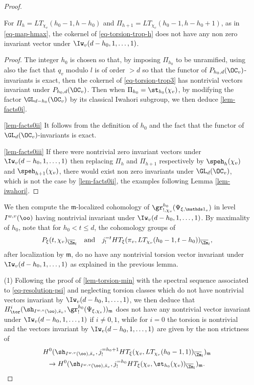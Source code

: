 \begin{proof}
\begin{lemma}
\begin{enumeratei}
\item\label{lem-facts0iii} For $\Pi_h=LT_{\chi_v}(h_0-1,h-h_0)$ and
$\Pi_{h+1}=LT_{\chi_v}(h_0-1,h-h_0+1)$, as in \eqref{eq-map-hmax},
the cokernel of \eqref{eq-torsion-trop-h} does not have any non zero invariant vector under
$\Iw_v(d-h_0,1,\dots,1)$.
\end{enumeratei}
\end{lemma}

\begin{proof}
The integer $h_0$ is chosen so that, by imposing $\Pi_{h_0}$ to be unramified,
using also the fact that $q_v$ modulo $l$ is of order $>d$ so that the functor of $P_{h_0,d}(\OC_v)$-invariants is exact,
then the cokernel of \eqref{eq-torsion-trop3}
has nontrivial vectors invariant under $P_{h_0,d}(\OC_v)$.
Then when $\Pi_{h_0}=\st_{h_0}(\chi_v)$, by modifying the factor
$\GL_{d-h_0}(\OC_v)$ by its classical Iwahori subgroup, we then deduce \eqref{lem-facts0i}.

\eqref{lem-facts0ii} It follows from the definition of $h_0$ and the fact that
the functor of $\GL_d(\OC_v)$-invariants is exact.

\eqref{lem-facts0iii} If there were nontrivial zero invariant vectors under $\Iw_v(d-h_0,1,\dots,1)$
then replacing $\Pi_h$ and $\Pi_{h+1}$ respectively by $\speh_h(\chi_v)$ and
$\speh_{h+1}(\chi_v)$, there would exist non zero invariants under
$\GL_d(\OC_v)$, which is not the case by \eqref{lem-facts0ii}, \cf the examples following
Lemma \ref{lem-iwahori}.
\end{proof}

We then compute the $\mathfrak m$-localized cohomology of
$\gr^{h_0}_{!,\chi_v}(\Psi_{\xi,\mathds 1_v})$
in level $I^{w,v}(\oo)$ having nontrivial invariant under
$\Iw_v(d-h_0,1,\dots,1)$.
By maximality of $h_0$, note that for $h_0<t \leq d$, the cohomology groups of
\[
P_\xi(t,\chi_v)_{\overline \Zm_l}\quad\text{and}\quad j^{=t}_! HT_\xi(\pi_v,LT_{\chi_v}(h_0-1,t-h_0))_{\overline \Zm_l},
\]
after localization by $\mathfrak m$, do no
have any nontrivial torsion vector invariant under \hbox{$\Iw_v(d-h_0,1,\dots,1)$}
as explained in the previous lemma.

(1) Following the proof of \ref{lem-torsion-min} with the spectral sequence
associated to
\eqref{eq-resolution-psi} and neglecting torsion classes
which do not have nontrivial vectors invariant by \hbox{$\Iw_v(d-h_0,1,\dots,1)$},
we then deduce that
$H^i_{\tor}(\sh_{I^{w,v}(\oo),\bar s_v},
\gr^{h_0}_{!}(\Psi_{\xi,\chi_v}))_{\mathfrak m}$ does not have any nontrivial vector invariant under $\Iw_v(d-h_0,1,\dots,1)$ if $i \neq 0,1$,
while for $i=0$ the torsion is nontrivial and the
vectors invariant by $\Iw_v(d-h_0,1,\dots,1)$ are given by the non strictness of
\begin{multline} \label{eq-torsion-trop}
H^{0}(\sh_{I^{w,v}(\oo),\bar s_v},j^{=h_0+1}_! HT_\xi(\chi_v,LT_{\chi_v}(h_0-1,1))_{\overline \Zm_l})_{\mathfrak m} \\
\to H^0(\sh_{I^{w,v}(\oo),\bar s_v},j^{=h_0}_!
HT_\xi(\chi_v,\st_{h_0}(\chi_v))_{\overline \Zm_l})_{\mathfrak m}.
\end{multline}


\end{proof}
